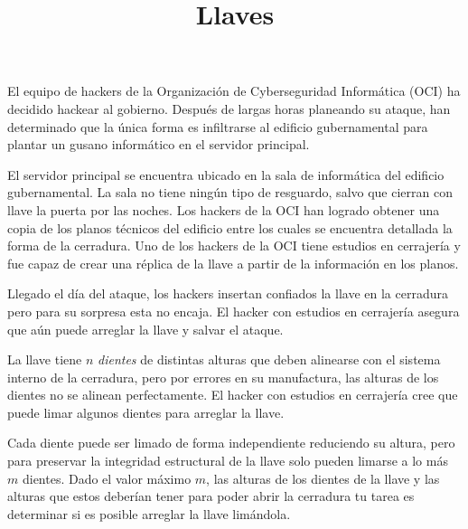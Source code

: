 \documentclass{oci}
\title{Llaves}
\begin{document}
\begin{problemDescription}
El equipo de hackers de la Organización de Cyberseguridad Informática (OCI)
ha decidido hackear al gobierno.
Después de largas horas planeando su ataque, han determinado que la única forma es infiltrarse
al edificio gubernamental para plantar un gusano informático en el servidor principal.

El servidor principal se encuentra ubicado en la sala de informática del edificio gubernamental.
La sala no tiene ningún tipo de resguardo, salvo que cierran con llave la puerta por las noches.
Los hackers de la OCI han logrado obtener una copia de los planos técnicos del edificio entre los
cuales se encuentra detallada la forma de la cerradura.
Uno de los hackers de la OCI tiene estudios en cerrajería y fue capaz de crear una réplica de la
llave a partir de la información en los planos.

Llegado el día del ataque, los hackers insertan confiados la llave en la cerradura pero para
su sorpresa esta no encaja.
El hacker con estudios en cerrajería asegura que aún puede arreglar la llave y salvar
el ataque.

La llave tiene $n$ \emph{dientes} de distintas alturas que deben alinearse con el sistema
interno de la cerradura, pero por errores en su manufactura, las alturas de los dientes
no se alinean perfectamente.
El hacker con estudios en cerrajería cree que puede limar algunos dientes para arreglar la llave.

Cada diente puede ser limado de forma independiente reduciendo su altura, pero para preservar
la integridad estructural de la llave solo pueden limarse a lo más $m$ dientes.
Dado el valor máximo $m$, las alturas de los dientes de la llave y las alturas que estos deberían
tener para poder abrir la cerradura tu tarea es determinar si es posible arreglar la llave
limándola.




\end{problemDescription}
\end{document}
